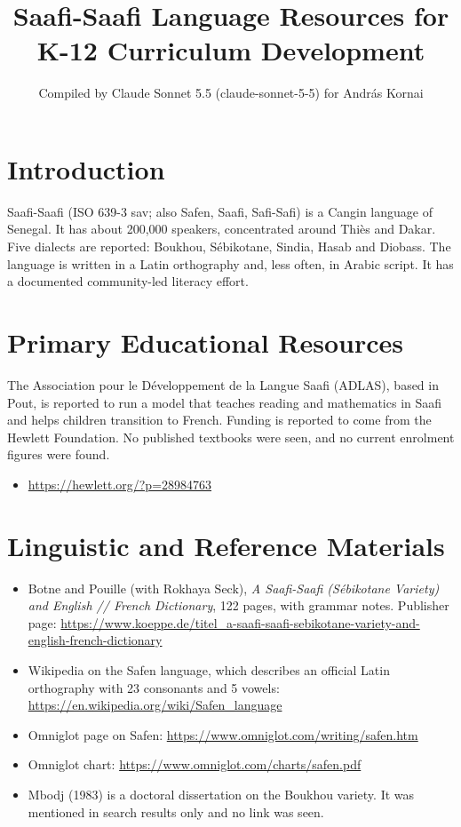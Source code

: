 \documentclass[12pt]{article}
\title{Saafi-Saafi Language Resources for K-12 Curriculum Development}
\author{Compiled by Claude Sonnet 5.5 (claude-sonnet-5-5) for Andr\'as Kornai}
\date{}
\begin{document}
\maketitle

\section{Introduction}
Saafi-Saafi (ISO 639-3 sav; also Safen, Saafi, Safi-Safi) is a Cangin language of Senegal. It has about 200,000 speakers, concentrated around Thi\`es and Dakar. Five dialects are reported: Boukhou, S\'ebikotane, Sindia, Hasab and Diobass. The language is written in a Latin orthography and, less often, in Arabic script. It has a documented community-led literacy effort.

\section{Primary Educational Resources}
The Association pour le D\'eveloppement de la Langue Saafi (ADLAS), based in Pout, is reported to run a model that teaches reading and mathematics in Saafi and helps children transition to French. Funding is reported to come from the Hewlett Foundation. No published textbooks were seen, and no current enrolment figures were found.
\begin{itemize}
\item \url{https://hewlett.org/?p=28984763}
\end{itemize}

\section{Linguistic and Reference Materials}
\begin{itemize}
\item Botne and Pouille (with Rokhaya Seck), \emph{A Saafi-Saafi (S\'ebikotane Variety) and English // French Dictionary}, 122 pages, with grammar notes. Publisher page: \url{https://www.koeppe.de/titel_a-saafi-saafi-sebikotane-variety-and-english-french-dictionary}
\item Wikipedia on the Safen language, which describes an official Latin orthography with 23 consonants and 5 vowels: \url{https://en.wikipedia.org/wiki/Safen_language}
\item Omniglot page on Safen: \url{https://www.omniglot.com/writing/safen.htm}
\item Omniglot chart: \url{https://www.omniglot.com/charts/safen.pdf}
\item Mbodj (1983) is a doctoral dissertation on the Boukhou variety. It was mentioned in search results only and no link was seen.
\end{itemize}
\end{document}

